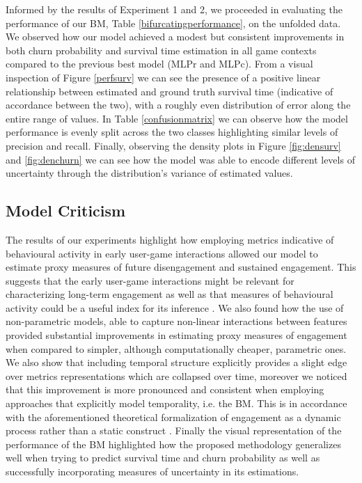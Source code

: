 
Informed by the results of Experiment 1 and 2, we proceeded in evaluating the performance of our BM, Table \ref{bifurcatingperformance}, on the unfolded data. We observed how our model achieved a modest but consistent improvements in both churn probability and survival time estimation in all game contexts compared to the previous best model (MLPr and MLPc). From a visual inspection of Figure \ref{perfsurv} we can see the presence of a positive linear relationship between estimated and ground truth survival time (indicative of accordance between the two), with a roughly even distribution of error along the entire range of values. In Table \ref{confusionmatrix} we can observe how the model performance is evenly split across the two classes highlighting similar levels of precision and recall. Finally, observing the density plots in Figure \ref{fig:densurv} and \ref{fig:denchurn} we can see how the model was able to encode different levels of uncertainty through the distribution's variance of estimated values.


\subsection{Model Criticism}
The results of our experiments highlight how employing metrics indicative of behavioural activity in early user-game interactions allowed our model to estimate proxy measures of future disengagement and sustained engagement. This suggests that the early user-game interactions might be relevant for characterizing long-term engagement as well as that measures of behavioural activity could be a useful index for its inference \cite{milovsevic2017early, mirza2013does}. We also found how the use of non-parametric models, able to capture non-linear interactions between features provided substantial improvements in estimating proxy measures of engagement when compared to simpler, although computationally cheaper, parametric ones. We also show that including temporal structure explicitly provides a slight edge over metrics representations which are collapsed over time, moreover we noticed that this improvement is more pronounced and consistent when employing approaches that explicitly model temporality, i.e. the BM. This is in accordance with the aforementioned theoretical formalization of engagement as a dynamic process rather than a static construct \cite{o2008user}. Finally the visual representation of the performance of the BM highlighted how the proposed methodology generalizes well when trying to predict survival time and churn probability as well as successfully incorporating measures of uncertainty in its estimations. 

